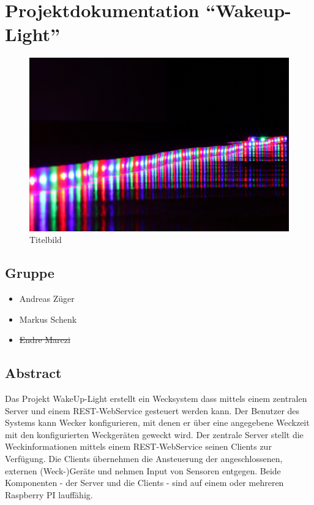 \documentclass[]{article}
\date{}
\begin{document}
\section{\texorpdfstring{Projektdokumentation
``Wakeup-Light''}{Projektdokumentation Wakeup-Light}}\label{projektdokumentation-wakeup-light}

\begin{figure}[H]
\centering
\includegraphics{../pictures/title_klein.JPG}
\caption{Titelbild}
\end{figure}

\subsection{Gruppe}\label{gruppe}

\begin{itemize}
\item
  Andreas Züger
\item
  Markus Schenk
\item
  \sout{Endre Marczi}
\end{itemize}

\subsection{Abstract}\label{abstract}

Das Projekt WakeUp-Light erstellt ein Wecksystem dass mittels einem
zentralen Server und einem REST-WebService gesteuert werden kann. Der
Benutzer des Systems kann Wecker konfigurieren, mit denen er über eine
angegebene Weckzeit mit den konfigurierten Weckgeräten geweckt wird. Der
zentrale Server stellt die Weckinformationen mittels einem
REST-WebService seinen Clients zur Verfügung. Die Clients übernehmen die
Ansteuerung der angeschlossenen, externen (Weck-)Geräte und nehmen Input
von Sensoren entgegen. Beide Komponenten - der Server und die Clients -
sind auf einem oder mehreren Raspberry PI lauffähig.
\end{document}
